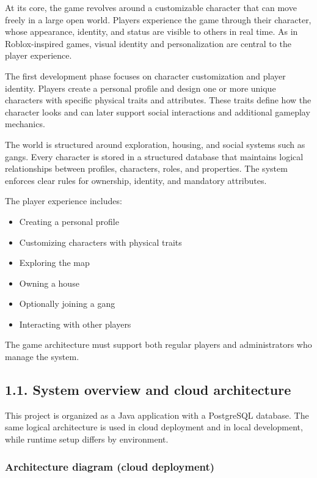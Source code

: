 At its core, the game revolves around a customizable character that can
move freely in a large open world. Players experience the game through
their character, whose appearance, identity, and status are visible to
others in real time. As in Roblox-inspired games, visual identity and
personalization are central to the player experience.

The first development phase focuses on character customization and
player identity. Players create a personal profile and design one or
more unique characters with specific physical traits and attributes.
These traits define how the character looks and can later support social
interactions and additional gameplay mechanics.

The world is structured around exploration, housing, and social systems
such as gangs. Every character is stored in a structured database that
maintains logical relationships between profiles, characters, roles, and
properties. The system enforces clear rules for ownership, identity, and
mandatory attributes.

The player experience includes:

\begin{itemize}
\tightlist
\item
  Creating a personal profile
\item
  Customizing characters with physical traits
\item
  Exploring the map
\item
  Owning a house
\item
  Optionally joining a gang
\item
  Interacting with other players
\end{itemize}

The game architecture must support both regular players and
administrators who manage the system.

\newpage

\hypertarget{system-overview-and-cloud-architecture}{%
\subsection{1.1. System overview and cloud
architecture}\label{system-overview-and-cloud-architecture}}

This project is organized as a Java application with a PostgreSQL
database. The same logical architecture is used in cloud deployment and
in local development, while runtime setup differs by environment.

\hypertarget{architecture-diagram-cloud-deployment}{%
\subsubsection{Architecture diagram (cloud
deployment)}\label{architecture-diagram-cloud-deployment}}

